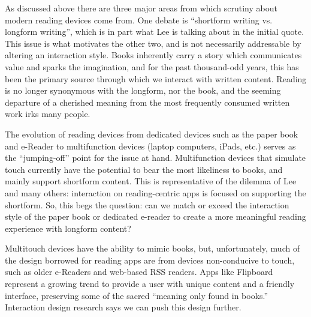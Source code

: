 \documentclass[11pt, oneside]{article}   	%
\begin{document}
As discussed above there are three major areas from which scrutiny about modern reading devices come from. One debate is ``shortform writing vs. longform writing'', which is in part what Lee is talking about in the initial quote. This issue is what motivates the other two, and is not necessarily addressable by altering an interaction style. Books inherently carry a story which communicates value and sparks the imagination, and for the past thousand-odd years, this has been the primary source through which we interact with written content. Reading is no longer synonymous with the longform, nor the book, and the seeming departure of a cherished meaning from the most frequently consumed written work irks many people.

The evolution of reading devices from dedicated devices such as the paper book and e-Reader to multifunction devices (laptop computers, iPads, etc.) serves as the ``jumping-off'' point for the issue at hand. Multifunction devices that simulate touch currently have the potential to bear the most likeliness to books, and mainly support shortform content. This is representative of the dilemma of Lee and many others: interaction on reading-centric apps is focused on supporting the shortform. So, this begs the question: can we match or exceed the interaction style of the paper book or dedicated e-reader to create a more meaningful reading experience with longform content?

Multitouch devices have the ability to mimic books, but, unfortunately, much of the design borrowed for reading apps are from devices non-conducive to touch, such as older e-Readers and web-based RSS readers. Apps like Flipboard represent a growing trend to provide a user with unique content and a friendly interface, preserving some of the sacred ``meaning only found in books.'' Interaction design research says we can push this design further.
\end{document}
